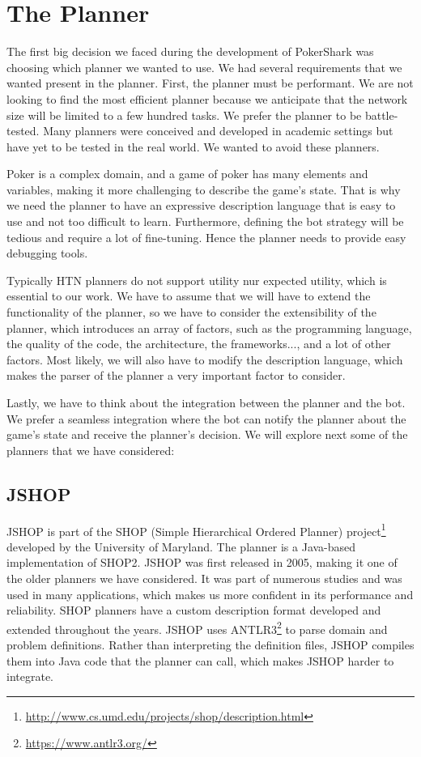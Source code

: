 
\section{The Planner}

The first big decision we faced during the development of PokerShark was choosing which planner we wanted to use. We had several requirements that we wanted present in the planner. First, the planner must be performant. We are not looking to find the most efficient planner because we anticipate that the network size will be limited to a few hundred tasks. We prefer the planner to be battle-tested. Many planners were conceived and developed in academic settings but have yet to be tested in the real world. We wanted to avoid these planners.

Poker is a complex domain, and a game of poker has many elements and variables, making it more challenging to describe the game's state. That is why we need the planner to have an expressive description language that is easy to use and not too difficult to learn. Furthermore, defining the bot strategy will be tedious and require a lot of fine-tuning. Hence the planner needs to provide easy debugging tools.

Typically HTN planners do not support utility nur expected utility, which is essential to our work. We have to assume that we will have to extend the functionality of the planner, so we have to consider the extensibility of the planner, which introduces an array of factors, such as the programming language, the quality of the code, the architecture, the frameworks..., and a lot of other factors. Most likely, we will also have to modify the description language, which makes the parser of the planner a very important factor to consider. 

Lastly, we have to think about the integration between the planner and the bot. We prefer a seamless integration where the bot can notify the planner about the game's state and receive the planner's decision. We will explore next some of the planners that we have considered:

\subsection*{JSHOP}

JSHOP is part of the SHOP (Simple Hierarchical Ordered Planner) project\footnote{\url{http://www.cs.umd.edu/projects/shop/description.html}} developed by the University of Maryland. The planner is a Java-based implementation of SHOP2. JSHOP was first released in 2005, making it one of the older planners we have considered. It was part of numerous studies and was used in many applications, which makes us more confident in its performance and reliability. SHOP planners have a custom description format developed and extended throughout the years. JSHOP uses ANTLR3\footnote{\url{https://www.antlr3.org/}} to parse domain and problem definitions. Rather than interpreting the definition files, JSHOP compiles them into Java code that the planner can call, which makes JSHOP harder to integrate.

